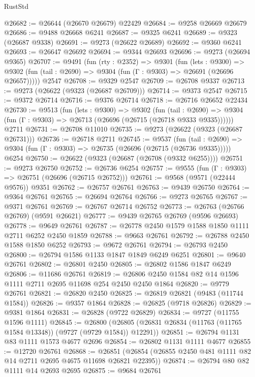 \begin{lexlean}{RustStd}
\begin{coremodule}
@26682 := @26644 (@26670 @26679) @22429
@26684 := @9258 @26669 @26679
@26686 := @9488 @26668 @6241
@26687 := @9325 @6241
@26689 := @9323 (@26687 @9338)
@26691 := @9273 (@26622 @26689)
@26692 := @9360 @6241
@26693 := @26647 @26692
@26694 := @9344 @26693
@26696 := @9273 (@26694 @9365)
@26707 := @9491
    (fun (rty : @2352) =>
    @9301
      (fun (lets : @9300) =>
      @9302 (fun (tail : @2690) => @9304 (fun (Γ : @9303) => @26691 (@26696 @26657)))))
    @2547
@26708 := @9329 @2547
@26709 := @26708 @9337
@26713 := @9273 (@26622 (@9323 (@26687 @26709)))
@26714 := @9373 @2547
@26715 := @9372 @26714
@26716 := @9376 @26714
@26718 := @26716 @26652 @22434
@26730 := @9513
    (fun (lets : @9300) =>
    @9302
      (fun (tail : @2690) =>
      @9304 (fun (Γ : @9303) => @26713 (@26696 (@26715 (@26718 @9333 @9335))))))
    @2711
@26731 := @26708 @11010
@26735 := @9273 (@26622 (@9323 (@26687 @26731)))
@26736 := @26718 @2711
@26745 := @9537
    (fun (tail : @2690) => @9304 (fun (Γ : @9303) => @26735 (@26696 (@26715 (@26736 @9335)))))
    @6254
@26750 := @26622 (@9323 (@26687 (@26708 (@9332 @6255))))
@26751 := @9273 @26750
@26752 := @26736 @6254
@26757 := @9555 (fun (Γ : @9303) => @26751 (@26696 (@26715 @26752)))
@26761 := @9568 (@9571 (@22444 @9576)) @9351
@26762 := @26757 @26761
@26763 := @9439 @26750
@26764 := @9364 @26761
@26765 := @26694 @26764
@26766 := @9273 @26765
@26767 := @9371 @26761
@26769 := @26767 @26714 @26752
@26773 := @26763 (@26766 @26769) (@9591 @26621)
@26777 := @9439 @26765 @26769 (@9596 @26693)
@26778 := @9649 @26761
@26787 := @26778 @2450 @1579 @1588 @1850 @1111 @2711 @6252 @2450 @1859
@26788 := @9663 @26761
@26792 := @26788 @2450 @1588 @1850 @6252
@26793 := @9672 @26761
@26794 := @26793 @2450
@26800 := @26794 @1586 @1133 @1847 @1849 @6249 @6251
@26801 := @9640 @26761
@26802 := @26801 @2450
@26805 := @26802 @1586 @1847 @6249
@26806 := @11686 @26761
@26819 := @26806 @2450 @1584 @82 @14 @1596 @1111 @2711 @2695 @11698 @254 @2450 @2450 @1864
@26820 := @9779 @26761
@26821 := @26820 @2450
@26825 := @26819 @26821 (@9483 (@11744 @1584))
@26826 := @9357 @1864
@26828 := @26825 (@9718 @26826)
@26829 := @9381 @1864
@26831 := @26828 (@9722 @26829)
@26834 := @9727 (@11755 @1596 @1111)
@26845 := @26800
    (@26805 (@26831 @26834 (@11763 (@11765 @1584 @13348)) (@9727 (@9729 @1584)) @12291))
@26851 := @26794 @1131 @83 @1111 @1573 @4677 @2696
@26854 := @26802 @1131 @1111 @4677
@26855 := @12720 @26761
@26868 := @26851 (@26854 (@26855 @2450 @481 @1111 @82 @14 @2711 @2695 @4675 @11698 @26821 @22395))
@26874 := @26794 @80 @82 @1111 @14 @2693 @2695
@26875 := @9684 @26761

\end{coremodule}
\end{lexlean}
